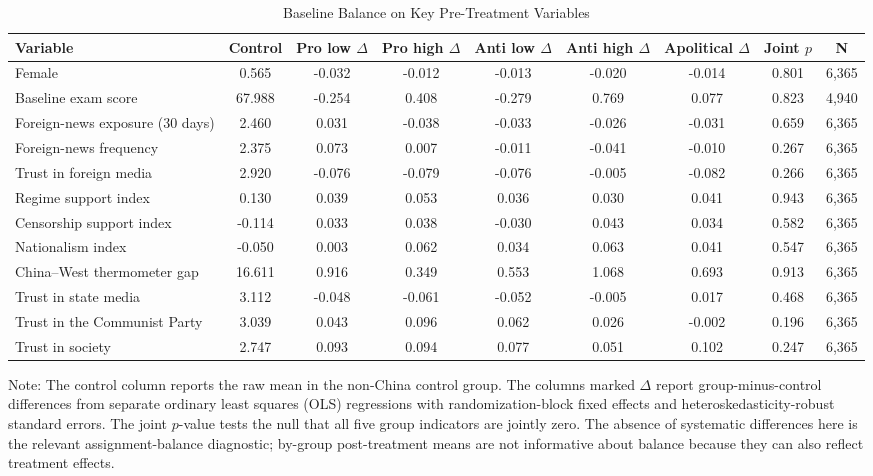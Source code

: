 \begin{table}[H]
\centering
\caption{Baseline Balance on Key Pre-Treatment Variables}
\label{tab:balance}
\scriptsize
\begin{threeparttable}
\setlength{\tabcolsep}{3pt}
\begin{tabular}{lcccccccc}
\toprule
Variable & Control & Pro low $\Delta$ & Pro high $\Delta$ & Anti low $\Delta$ & Anti high $\Delta$ & Apolitical $\Delta$ & Joint $p$ & N \\
\midrule
Female & 0.565 & -0.032 & -0.012 & -0.013 & -0.020 & -0.014 & 0.801 & 6,365 \\
Baseline exam score & 67.988 & -0.254 & 0.408 & -0.279 & 0.769 & 0.077 & 0.823 & 4,940 \\
Foreign-news exposure (30 days) & 2.460 & 0.031 & -0.038 & -0.033 & -0.026 & -0.031 & 0.659 & 6,365 \\
Foreign-news frequency & 2.375 & 0.073 & 0.007 & -0.011 & -0.041 & -0.010 & 0.267 & 6,365 \\
Trust in foreign media & 2.920 & -0.076 & -0.079 & -0.076 & -0.005 & -0.082 & 0.266 & 6,365 \\
Regime support index & 0.130 & 0.039 & 0.053 & 0.036 & 0.030 & 0.041 & 0.943 & 6,365 \\
Censorship support index & -0.114 & 0.033 & 0.038 & -0.030 & 0.043 & 0.034 & 0.582 & 6,365 \\
Nationalism index & -0.050 & 0.003 & 0.062 & 0.034 & 0.063 & 0.041 & 0.547 & 6,365 \\
China--West thermometer gap & 16.611 & 0.916 & 0.349 & 0.553 & 1.068 & 0.693 & 0.913 & 6,365 \\
Trust in state media & 3.112 & -0.048 & -0.061 & -0.052 & -0.005 & 0.017 & 0.468 & 6,365 \\
Trust in the Communist Party & 3.039 & 0.043 & 0.096 & 0.062 & 0.026 & -0.002 & 0.196 & 6,365 \\
Trust in society & 2.747 & 0.093 & 0.094 & 0.077 & 0.051 & 0.102 & 0.247 & 6,365 \\
\bottomrule
\end{tabular}
\begin{tablenotes}[flushleft]
\footnotesize
\item Note: The control column reports the raw mean in the non-China control group. The columns marked $\Delta$ report group-minus-control differences from separate ordinary least squares (OLS) regressions with randomization-block fixed effects and heteroskedasticity-robust standard errors. The joint $p$-value tests the null that all five group indicators are jointly zero. The absence of systematic differences here is the relevant assignment-balance diagnostic; by-group post-treatment means are not informative about balance because they can also reflect treatment effects.
\end{tablenotes}
\end{threeparttable}
\end{table}
